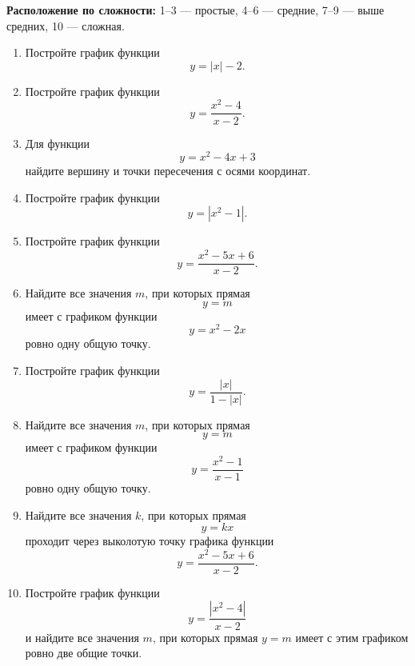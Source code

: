 \documentclass[a4paper,12pt]{article}
\begin{document}
\textbf{Расположение по сложности:} 1--3 --- простые, 4--6 --- средние, 7--9 --- выше средних, 10 --- сложная.

\begin{enumerate}
	\item Постройте график функции
	\[
	y=|x|-2.
	\]

	\item Постройте график функции
	\[
	y=\frac{x^2-4}{x-2}.
	\]

	\item Для функции
	\[
	y=x^2-4x+3
	\]
	найдите вершину и точки пересечения с осями координат.

	\item Постройте график функции
	\[
	y=|x^2-1|.
	\]

	\item Постройте график функции
	\[
	y=\frac{x^2-5x+6}{x-2}.
	\]

	\item Найдите все значения \(m\), при которых прямая
	\[
	y=m
	\]
	имеет с графиком функции
	\[
	y=x^2-2x
	\]
	ровно одну общую точку.

	\item Постройте график функции
	\[
	y=\frac{|x|}{1-|x|}.
	\]

	\item Найдите все значения \(m\), при которых прямая
	\[
	y=m
	\]
	имеет с графиком функции
	\[
	y=\frac{x^2-1}{x-1}
	\]
	ровно одну общую точку.

	\item Найдите все значения \(k\), при которых прямая
	\[
	y=kx
	\]
	проходит через выколотую точку графика функции
	\[
	y=\frac{x^2-5x+6}{x-2}.
	\]

	\item Постройте график функции
	\[
	y=\frac{|x^2-4|}{x-2}
	\]
	и найдите все значения \(m\), при которых прямая \(y=m\) имеет с этим графиком ровно две общие точки.
\end{enumerate}
\end{document}
